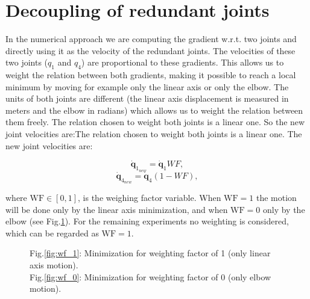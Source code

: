 \section{Decoupling of redundant joints}
\label{sec:Decoupling}
\label{subsubsec:weighting}




In the numerical approach we are computing the gradient w.r.t. two joints and directly using it as the velocity of the redundant joints. The velocities of these two joints ($q_1$ and $q_4$) are proportional to these gradients. This allows us to weight the relation between both gradients, making it possible to reach a local minimum
by moving for example only the linear axis or only the elbow. The units of both joints are different (the linear axis displacement is measured in meters and the elbow in radians) which allows us to weight the relation between them freely.
The relation chosen to weight both joints is a linear one. So the new joint velocities are:The relation chosen to weight both joints is a linear one. The new joint velocities are:

\begin{equation}
	\mathbf{\dot{q}}_{1_{new}}  = \mathbf{\dot{q}}_{1}WF,
	\label{eq:decoupling_q1} 
\end{equation} 
\begin{equation}
	\mathbf{\dot{q}}_{4_{new}} = \mathbf{\dot{q}}_{4}(1-WF),
	\label{eq:decoupling_q4}
\end{equation}


where $\mathrm{WF \in [0,1]}$, is the weighing factor variable.
When $\mathrm{WF=1}$ the motion will be done only by the linear axis minimization, and when $\mathrm{WF=0}$ only by the elbow (see Fig.\ref{fig:wf}).
For the  remaining experiments no weighting is considered, which can be regarded as $\mathrm{WF=1}$.

\begin{figure}[!h]
	\centering	
	 	 	 	
	\caption{Fig.\ref{fig:wf_1}: Minimization for weighting factor of 1 (only  linear axis motion). \\ Fig.\ref{fig:wf_0}: Minimization for weighting factor of 0 (only elbow motion). }
	\label{fig:wf}
\end{figure}

